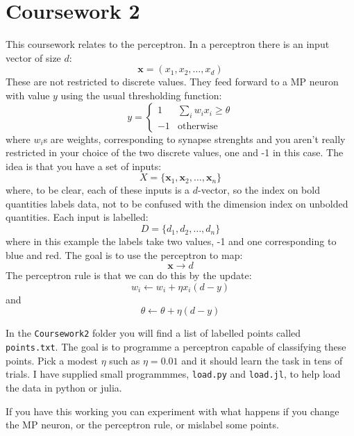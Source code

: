 \documentclass[12pt]{article}
\begin{document}
\section*{Coursework 2}

This coursework relates to the perceptron. In a perceptron there is an input vector of size $d$:
\begin{equation}
  \mathbf{x}=(x_1,x_2,\ldots,x_d)
\end{equation}
These are not restricted to discrete values. They feed forward to a MP neuron with value $y$ using the usual thresholding function:
\begin{equation}
  y=\left\{\begin{array}{ll}1&\sum_i w_ix_i\ge \theta\\-1&\mbox{otherwise}\end{array}\right.
\end{equation}
where $w_i$s are weights, corresponding to synapse strenghts and you
aren't really restricted in your choice of the two discrete values,
one and -1 in this case. The idea is that you have a set of inputs:
\begin{equation}
  X=\{\mathbf{x}_1,\mathbf{x}_2,\ldots,\mathbf{x}_n\}
\end{equation}
where, to be clear, each of these inputs is a $d$-vector, so the index
on bold quantities labels data, not to be confused with the dimension
index on unbolded quantities. Each input is labelled:
\begin{equation}
  D=\{d_1,d_2,\ldots,d_n\}
\end{equation}
where in this example the labels take two values, -1 and one
corresponding to blue and red. The goal is to use the perceptron to map:
\begin{equation}
  \textbf{x}\rightarrow d
\end{equation}
The perceptron rule is that we can do this by the update:
\begin{equation}
  w_i\leftarrow w_i+\eta x_i (d-y)
\end{equation}
and
\begin{equation}
  \theta\leftarrow \theta+\eta(d-y)
\end{equation}

In the \texttt{Coursework2} folder you will find a list of labelled
points called \texttt{points.txt}. The goal is to programme a
  perceptron capable of classifying these points. Pick a modest $\eta$
  such as $\eta=0.01$ and it should learn the task in tens of
  trials. I have supplied small programmmes, \texttt{load.py} and
  \texttt{load.jl}, to help load the data in python or julia.

If you have this working you can experiment with what happens if you
change the MP neuron, or the perceptron rule, or mislabel some points.
\end{document}
